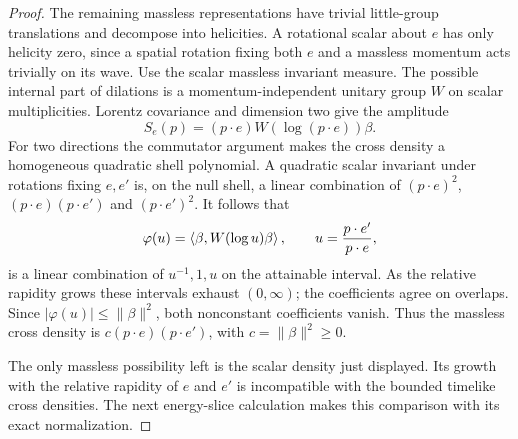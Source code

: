 \begin{proof}
The remaining massless representations have trivial little-group
translations and decompose into helicities.  A rotational scalar about
$e$ has only helicity zero, since a spatial rotation fixing both $e$ and
a massless momentum acts trivially on its wave.  Use the scalar
massless invariant measure.  The possible internal part of dilations
is a momentum-independent unitary group $W$ on scalar multiplicities.
Lorentz covariance and dimension two give the amplitude
\begin{equation}\label{E:massless-amplitude}
 S_e(p)=(p\cdot e)W(\log(p\cdot e))\beta.
\end{equation}
For two directions the commutator argument makes the cross density a
homogeneous quadratic shell polynomial.  A quadratic scalar invariant
under rotations fixing $e,e'$ is, on the null shell, a linear
combination of $(p\cdot e)^2$, $(p\cdot e)(p\cdot e')$ and
$(p\cdot e')^2$.  It follows that
\[
 \varphi(u)=\left\langle\beta,W(\log u)\beta\right\rangle,\qquad
 u=\frac{p\cdot e'}{p\cdot e},
\]
is a linear combination of $u^{-1},1,u$ on the attainable interval.
As the relative rapidity grows these intervals exhaust $(0,\infty)$;
the coefficients agree on overlaps.  Since
$|\varphi(u)|\leq\|\beta\|^2$, both nonconstant coefficients vanish.
Thus the massless cross density is
$c(p\cdot e)(p\cdot e')$, with $c=\|\beta\|^2\geq0$.

The only massless possibility left is the scalar density just
displayed.  Its growth with the relative rapidity of $e$ and $e'$ is
incompatible with the bounded timelike cross densities.  The next
energy-slice calculation makes this comparison with its exact
normalization.


\end{proof}
